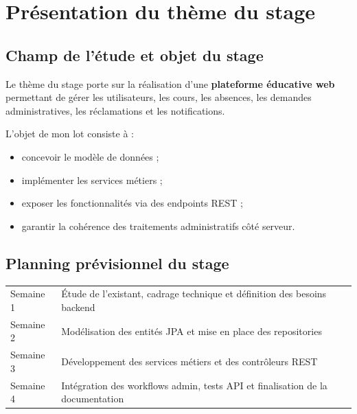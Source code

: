 \chapter{Présentation du thème du stage}

\section{Champ de l'étude et objet du stage}
Le thème du stage porte sur la réalisation d'une \textbf{plateforme éducative web} permettant de gérer les utilisateurs, les cours, les absences, les demandes administratives, les réclamations et les notifications.

L'objet de mon lot consiste à :
\begin{itemize}
	\item concevoir le modèle de données ;
	\item implémenter les services métiers ;
	\item exposer les fonctionnalités via des endpoints REST ;
	\item garantir la cohérence des traitements administratifs côté serveur.
\end{itemize}

\section{Planning prévisionnel du stage}
\begin{longtable}{p{}p{}}
\toprule
Semaine 1 & Étude de l'existant, cadrage technique et définition des besoins backend \\
Semaine 2 & Modélisation des entités JPA et mise en place des repositories \\
Semaine 3 & Développement des services métiers et des contrôleurs REST \\
Semaine 4 & Intégration des workflows admin, tests API et finalisation de la documentation \\
\bottomrule
\end{longtable}
